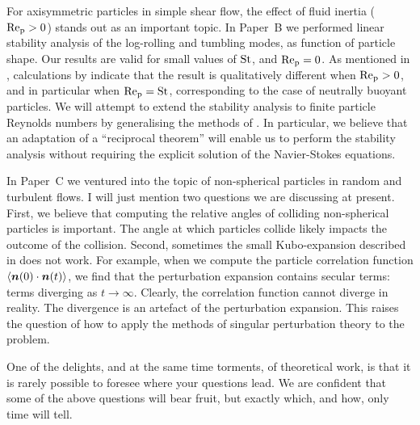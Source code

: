 \documentclass[thesis.tex]{subfiles}
\begin{document}
For axisymmetric particles in simple shear flow, the effect of fluid inertia ($\mbox{Re}_{\mathrm p}>0$) stands out as an important topic. In Paper~B we performed linear stability analysis of the log-rolling and tumbling modes, as function of particle shape. Our results are valid for small values of $\mbox{St}$, and $\mbox{Re}_{\mathrm p} =0$. As mentioned in , calculations by  indicate that the result is qualitatively different when $\mbox{Re}_{\mathrm p}>0$, and in particular when $\mbox{Re}_{\mathrm p}=\mbox{St}$, corresponding to the case of neutrally buoyant particles. We will attempt to extend the stability analysis to finite particle Reynolds numbers by generalising the methods of \cite{subramanian2005,subramanian2006}. In particular, we believe that an adaptation of a ``reciprocal theorem'' \cite{lovalenti1993} will enable us to perform the stability analysis without requiring the explicit solution of the Navier-Stokes equations.

In Paper~C we ventured into the topic of non-spherical particles in random and turbulent flows. I will just mention two questions we are discussing at present. First, we believe that computing the relative angles of colliding non-spherical particles is important. The angle at which particles collide likely impacts the outcome of the collision. Second, sometimes the small Kubo-expansion described in  does not work. For example, when we compute the particle correlation function $\langle \mbox{\boldmath$n$}(0)\cdot\mbox{\boldmath$n$}(t)\rangle$, we find that the perturbation expansion contains secular terms: terms diverging as $t\to\infty$. Clearly, the correlation function cannot diverge in reality. The divergence is an artefact of the perturbation expansion. This raises the question of how to apply the methods of singular perturbation theory to the problem.

One of the delights, and at the same time torments, of theoretical work, is that it is rarely possible to foresee where your questions lead. We are confident that some of the above questions will bear fruit, but exactly which, and how, only time will tell.
\end{document}
